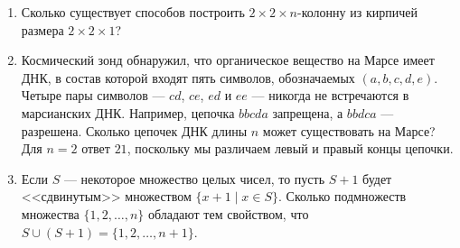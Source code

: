 \documentclass[14pt]{book}
\begin{document}
\begin{enumerate}
\item Сколько существует способов построить $2 \times 2 \times n$-колонну из кирпичей
      размера $2 \times 2 \times 1$?
      
\item Космический зонд обнаружил, что органическое вещество на Марсе имеет ДНК, в состав
      которой входят пять символов, обозначаемых $(a, b, c, d, e)$. Четыре пары символов
      --- $cd$, $ce$, $ed$ и $ee$ --- никогда не встречаются в марсианских ДНК.
      Например, цепочка $bbcda$ запрещена, а $bbdca$ --- разрешена.
      Сколько цепочек ДНК длины $n$ может существовать на Марсе?
      Для $n=2$ ответ $21$, поскольку мы различаем левый и правый концы цепочки.

\item Если $S$ --- некоторое множество целых чисел, то пусть $S+1$ будет <<сдвинутым>>
множеством $\{x+1 \mid x \in S\}$. Сколько подмножеств множества $\{1,2,\ldots,n\}$ обладают
тем свойством, что $S\cup(S+1) = \{1,2,\ldots,n+1\}$.

\end{enumerate}
\end{document}

